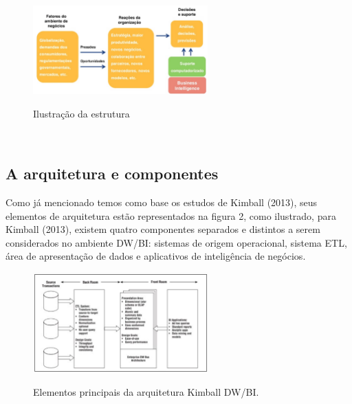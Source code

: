 \begin{figure}[H]
	\vspace*{0,2cm}
    \centering
    \caption{Ilustra\c{c}\~{a}o da estrutura}
    \includegraphics[width=0.6\textwidth]{./04-figuras/figura-01}
    \label{fig:ilustfig01}
\end{figure}
\vspace*{-0,9cm}
{\raggedright {}}\\

\subsection{A arquitetura e componentes}

Como j\'{a} mencionado temos como base os estudos de Kimball (2013), seus elementos de arquitetura est\~{a}o representados na figura 2, como ilustrado, para Kimball (2013), existem quatro componentes separados e distintos a serem considerados no ambiente DW/BI: sistemas de origem operacional, sistema ETL, \'{a}rea de apresenta\c{c}\~{a}o de dados e aplicativos de intelig\^{e}ncia de neg\'{o}cios.

\begin{figure}[H]
	\vspace*{0,2cm}
    \centering
    \caption{Elementos principais da arquitetura Kimball DW/BI.}
    \includegraphics[width=0.6\textwidth]{./04-figuras/figura-02}
    \label{fig:ilustfig02}
\end{figure}
\vspace*{-0,9cm}
{\raggedright {}}\\

